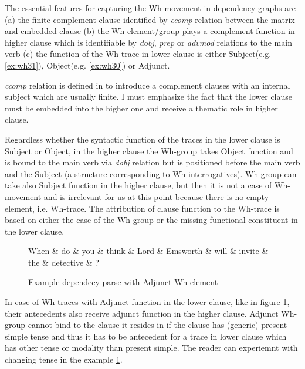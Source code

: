 The essential features for capturing the Wh-movement in dependency graphs are (a) the finite complement clause identified by \textit{ccomp} relation between the matrix and embedded clause (b) the Wh-element/group plays a complement function in higher clause which is identifiable by \textit{dobj}, \textit{prep} or \textit{advmod} relations to the main verb (c) the function of the Wh-trace in lower clause is either Subject(e.g. \ref{ex:wh31}), Object(e.g. \ref{ex:wh30}) or Adjunct. 

\textit{ccomp} relation is defined in \cite{Marneffe2008} to introduce a complement clauses with an internal subject which are usually finite. I must emphasize the fact that the lower clause must be embedded into the higher one and receive a thematic role in higher clause.

Regardless whether the syntactic function of the traces in the lower clause is Subject or Object, in the higher clause the Wh-group takes Object function and is bound to the main verb via \textit{dobj} relation but is positioned before the main verb and the Subject (a structure corresponding to Wh-interrogatives). Wh-group can take also Subject function in the higher clause, but then it is not a case of Wh-movement and is irrelevant for us at this point because there is no empty element, i.e. Wh-trace. The attribution of clause function to the Wh-trace is based on either the case of the Wh-group or the missing functional constituent in the lower clause. 

\begin{figure}[hbtp]
	\centering
	\begin{dependency}
		\begin{deptext}[]
			When \& do \& you \& think \& Lord \& Emsworth \& will \& invite \& the \& detective \& ?\\
		\end{deptext}
	\end{dependency}
	\caption{Example dependecy parse with Adjunct Wh-element}
	\label{fig:e22}
\end{figure}

In case of Wh-traces with Adjunct function in the lower clause, like in figure \ref{fig:e22}, their antecedents also receive adjunct function in the higher clause. Adjunct Wh-group cannot bind to the clause it resides in if the clause has (generic) present simple tense and thus it has to be antecedent for a trace in lower clause which has other tense or modality than present simple. The reader can experiemnt with changing tense in the example \ref{fig:e22}. 

